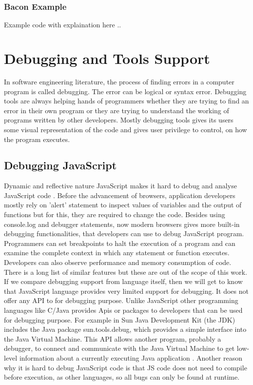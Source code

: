 \subsubsection{Bacon Example}
Example code with explaination here ..

\section{Debugging and Tools Support}
In software engineering literature, the process of finding errors in a computer program is called debugging. The error can be logical or syntax error. Debugging tools are always helping hands of programmers whether they are trying to find an error in their own program or they are trying to understand the working of programs written by other developers. Mostly debugging tools gives its users some visual representation of the code and gives user privilege to control, on how the program executes. 

\subsection{Debugging JavaScript}
Dynamic and reflective nature JavaScript makes it hard to debug and analyse JavaScript code \citep{Richards:2010:ADB:1809028.1806598, Schafer:2012:RTD:2328876.2328885}. Before the advancement of browsers, application developers mostly rely on 'alert' statement to inspect values of variables and the output of functions but for this, they are required to change the code. Besides using console.log and debugger statements, now modern browsers gives more built-in debugging functionalities, that developers can use to debug JavaScript program. Programmers can set breakpoints to halt the execution of a program and can examine the complete context in which any statement or function executes. Developers can also observe performance and memory consumption of code. There is a long list of similar features but these are out of the scope of this work.
If we compare debugging support from language itself, then we will get to know that JavaScript language provides very limited support for debugging. It does not offer any API to for debugging purpose. Unlike JavaScript other programming languages like C/Java provides Apis or packages to developers that can be used for debugging purpose. For example in Sun Java Development Kit (the JDK) includes the Java package sun.tools.debug, which provides a simple interface into the Java Virtual Machine. This API allows another program, probably a debugger, to connect and communicate with the Java Virtual Machine to get low-level information about a currently executing Java application \citep{vanderburg1996tricks}. Another reason why it is hard to debug JavaScript code is that JS code does not need to compile before execution, as other languages, so all bugs can only be found at runtime.

